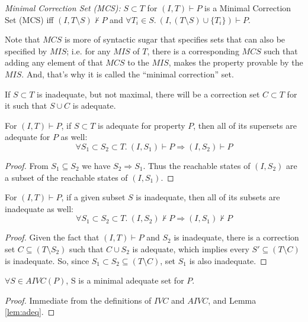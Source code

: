 \begin{definition}{\emph{Minimal Correction Set (MCS):}}
  \label{def:mcs}
  $S \subset T$ for $(I, T) \vdash P$ is a Minimal Correction Set (MCS) iff
  $(I, T \setminus S) \nvdash P$ and $\forall T_i \in S.~ (I, (T \setminus S)\cup \{T_i\}) \vdash P$.
\end{definition}

Note that $MCS$ is more of syntactic sugar that specifies sets that can also be specified by $MIS$; i.e. for any $MIS$ of $T$, there is a corresponding $MCS$ such that adding any element of that $MCS$ to the $MIS$, makes the property provable by the $MIS$.
And, that's why it is called the ``minimal correction'' set.
\begin{note}
If $S \subset T$ is inadequate, but not maximal, there will be a correction set $C \subset T$ for it such that $S \cup C$ is adequate.
\end{note}

\begin{lemma}
\label{lem:adeq}
For $(I, T) \vdash P$, if $S \subset T$ is adequate for property $P$, then all of its supersets are adequate for $P$ as well:
\allowbreak $$\forall S_1 \subset S_2 \subset T.~ (I, S_1) \vdash P \Rightarrow (I, S_2) \vdash P$$
\end{lemma}
\begin{proof}
From $S_1 \subseteq S_2$ we have $S_2 \Rightarrow S_1$. Thus the
  reachable states of $(I, S_2)$ are a subset of the reachable states
  of $(I, S_1)$.
\end{proof}

\begin{lemma}
\label{lem:inadeq}
For $(I, T) \vdash P$, if a given subset $S$ is inadequate, then all of its subsets are inadequate as well:
\allowbreak $$\forall S_1 \subset S_2 \subset T.~ (I, S_2) \nvdash P \Rightarrow (I, S_1) \nvdash P$$
\end{lemma}
\begin{proof}
Given the fact that $(I, T) \vdash P$ and $S_2$ is inadequate,
there is a correction set $C \subseteq (T\setminus S_2)$ such that
$C \cup S_2$ is adequate, which implies every $S' \subseteq (T \setminus C)$ is inadequate.
So, since $S_1 \subset S_2 \subseteq (T \setminus C)$, set $S_1$ is also inadequate.
\end{proof}

\begin{corol}
$\forall S \in AIVC(P)$, S is a minimal adequate set for $P$.
\end{corol}
\begin{proof}
  Immediate from the definitions of $IVC$ and $AIVC$, and Lemma \ref{lem:adeq}.
\end{proof}

